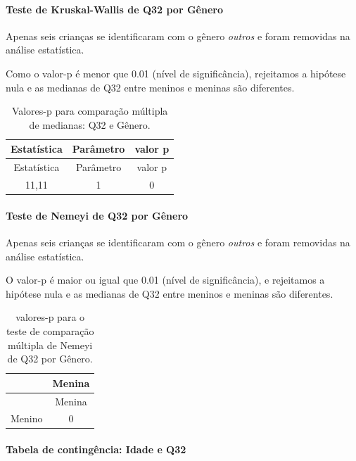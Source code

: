 \documentclass[]{article}
\let\oldparagraph\paragraph
\renewcommand{\paragraph}[1]{\oldparagraph{#1}\mbox{}}
\begin{document}
\hypertarget{teste-de-kruskal-wallis-de-q32-por-guxeanero}{%
\paragraph{Teste de Kruskal-Wallis de Q32 por Gênero}\label{teste-de-kruskal-wallis-de-q32-por-guxeanero}}

Apenas seis crianças se identificaram com o gênero \emph{outros} e foram removidas na análise estatística.

Como o valor-p é menor que 0.01 (nível de significância), rejeitamos a hipótese nula e as medianas de Q32 entre meninos e meninas são diferentes.

\begin{longtable}[]{@{}ccc@{}}
\caption{\label{tab:unnamed-chunk-1092}Valores-p para comparação múltipla de medianas: Q32 e Gênero.}\tabularnewline
\toprule
Estatística & Parâmetro & valor p\tabularnewline
\midrule
\endfirsthead
\toprule
Estatística & Parâmetro & valor p\tabularnewline
\midrule
\endhead
11,11 & 1 & 0\tabularnewline
\bottomrule
\end{longtable}

\hypertarget{teste-de-nemeyi-de-q32-por-guxeanero}{%
\paragraph{Teste de Nemeyi de Q32 por Gênero}\label{teste-de-nemeyi-de-q32-por-guxeanero}}

Apenas seis crianças se identificaram com o gênero \emph{outros} e foram removidas na análise estatística.

O valor-p é maior ou igual que 0.01 (nível de significância), e rejeitamos a hipótese nula e as medianas de Q32 entre meninos e meninas são diferentes.

\begin{longtable}[]{@{}lc@{}}
\caption{\label{tab:unnamed-chunk-1094}valores-p para o teste de comparação múltipla de Nemeyi de Q32 por Gênero.}\tabularnewline
\toprule
& Menina\tabularnewline
\midrule
\endfirsthead
\toprule
& Menina\tabularnewline
\midrule
\endhead
Menino & 0\tabularnewline
\bottomrule
\end{longtable}

\cleardoublepage

\hypertarget{tabela-de-continguxeancia-idade-e-q32}{%
\paragraph{Tabela de contingência: Idade e Q32}\label{tabela-de-continguxeancia-idade-e-q32}}
\end{document}
